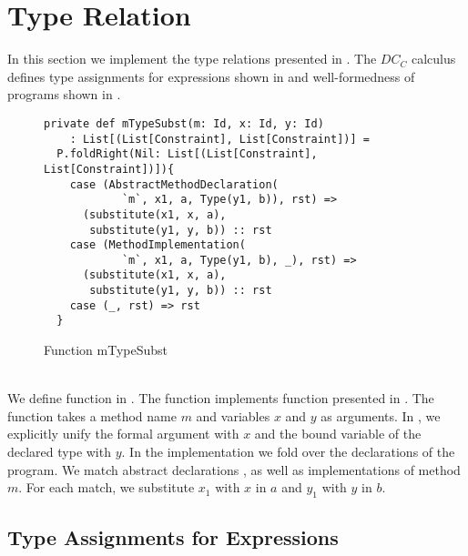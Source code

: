 \section{Type Relation}
In this section we implement the type relations presented in .
The $DC_C$ calculus defines type assignments for expressions
shown in 
and well-formedness of programs shown in .
%
\begin{figure}[h]
\begin{lstlisting}
private def mTypeSubst(m: Id, x: Id, y: Id)
    : List[(List[Constraint], List[Constraint])] =
  P.foldRight(Nil: List[(List[Constraint], List[Constraint])]){
    case (AbstractMethodDeclaration(
            `m`, x1, a, Type(y1, b)), rst) =>
      (substitute(x1, x, a),
       substitute(y1, y, b)) :: rst
    case (MethodImplementation(
            `m`, x1, a, Type(y1, b), _), rst) =>
      (substitute(x1, x, a),
       substitute(y1, y, b)) :: rst
    case (_, rst) => rst
  }
\end{lstlisting}
\caption{Function mTypeSubst}
\label{fig:scala-mtype}
\end{figure}\\
We define function  in .
The function implements function 
presented in .
The function takes a method name $m$ and
variables $x$ and $y$ as arguments.
In , we explicitly unify the formal argument
with $x$ and the bound variable of the declared type with $y$.
In the implementation we fold over the declarations of the program.
We match abstract declarations ,
as well as implementations  of method $m$.
For each match, we substitute $x_1$ with $x$ in $a$ and $y_1$ with $y$ in $b$.


\subsection{Type Assignments for Expressions}
\label{sec:typeass}
\cite{tpl}

